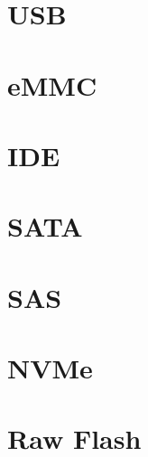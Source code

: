 \documentclass[12pt,article]{memoir}
\begin{document}
\section{USB}
\section{eMMC}
\section{IDE}
\section{SATA}
\section{SAS}
\section{NVMe}
\section{Raw Flash}

\end{document}
